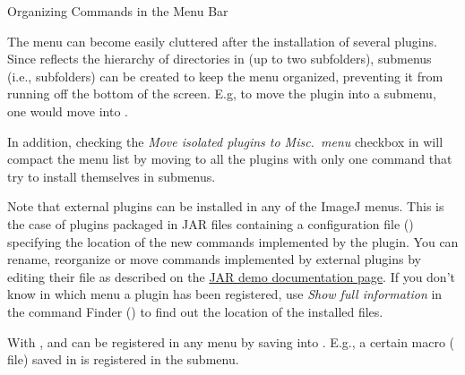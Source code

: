\begin{infobox}
\caption{\label{infobox:Organizing-Commands}Organizing Commands in the Menu
Bar}


The  menu can become easily
cluttered after the installation of several plugins. Since 
reflects the hierarchy of directories in 
(up to two subfolders), submenus (i.e., subfolders) can be created
to keep the menu organized, preventing it from running off the bottom
of the screen. E.g, to move the 
plugin into a 
submenu, one would move  into .\medskip{}


In addition, checking the \emph{Move isolated plugins to Misc.\ menu}
checkbox in 
will compact the menu list by moving to 
all the plugins with only one command that try to install themselves
in submenus. \medskip{}


Note that external plugins can be installed in any of the ImageJ menus.
This is the case of plugins packaged in JAR files containing a configuration
file () specifying
the location of the new commands implemented by the plugin. You can
rename, reorganize or move commands implemented by external plugins
by editing their  file as described on
the \href{http://rsbweb.nih.gov/ij/plugins/jar-demo.html}{JAR demo documentation page}.
If you don't know in which menu a plugin has been registered, use
\emph{Show full information} in the command Finder ()
to find out the location of the installed  files.

\medskip{}
With ,  and 
can be registered in any menu by saving into .
E.g., a certain macro ( file) saved in 
is registered in the 
submenu.


\end{infobox}



